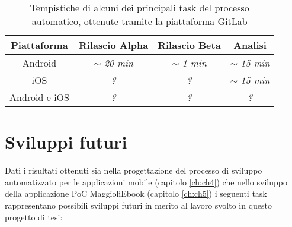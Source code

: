 

\begin{table}[H]
\centering
    \begin{tabular}{|c|c|c|c|}
         \hline
         \textbf{Piattaforma} & \textbf{Rilascio Alpha} & \textbf{Rilascio Beta} & \textbf{Analisi}\\
         \hline
         Android & $\sim$ \textit{20 min} & $\sim$ \textit{1 min} & $\sim$ \textit{15 min} \\
         \hline
         iOS & \textit{?} & \textit{?} & $\sim$ \textit{15 min} \\
         \hline
         Android e iOS & \textit{?} & \textit{?} & \textit{?} \\
         \hline
    \end{tabular}
    \caption{Tempistiche di alcuni dei principali task del processo automatico, ottenute tramite la piattaforma GitLab}
\end{table}

\section{Sviluppi futuri}
Dati i risultati ottenuti sia nella progettazione del processo di sviluppo automatizzato per le applicazioni mobile (capitolo \ref{ch:ch4}) che nello sviluppo della applicazione PoC MaggioliEbook (capitolo \ref{ch:ch5}) i seguenti task rappresentano possibili sviluppi futuri in merito al lavoro svolto in questo progetto di tesi:

